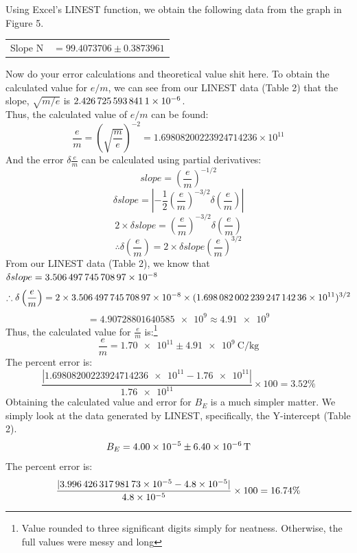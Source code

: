 \documentclass[letterpaper]{article}
\begin{document}
\newpage
\noindent Using Excel's LINEST function, we obtain the following data from the graph in Figure 5.
\begin{table}[H]
\centering
\begin{tabular}{cc}
  Slope N &  $ =99.4073706 \pm 0.3873961 $ \\
\end{tabular}
\end{table}

Now do your error calculations and theoretical value shit here.
\noindent To obtain the calculated value for $e/m$, we can see from our LINEST data (Table 2) that the slope, $\sqrt{m/e}$ is
$\num{2.4267255938411E-06}$.\\
Thus, the calculated value of $e/m$ can be found:
$$ \frac{e}{m} = \left(\sqrt{\frac{m}{e}}\right)^{-2} = 1.69808200223924714236 \times 10^{11} $$
And the error $\delta \frac{e}{m}$ can be calculated using partial derivatives:
$$slope= \left(\frac{e}{m}\right)^{-1/2}$$
$$\delta slope = \left| -\frac{1}{2} \left(\frac{e}{m}\right)^{-3/2} \delta \left(\frac{e}{m}\right)\right|$$
$$ 2 \times \delta slope = \left(\frac{e}{m}\right)^{-3/2} \delta \left(\frac{e}{m}\right) $$
$$ \therefore \delta \left(\frac{e}{m}\right) = 2 \times \delta slope \left(\frac{e}{m}\right)^{3/2}$$
From our LINEST data (Table 2), we know that $\delta slope = \num{3.50649774570897E-08} $
$$ \therefore \delta \left(\frac{e}{m}\right) = 2 \times \num{3.50649774570897E-08} \times (\num{1.69808200223924714236e11})^{3/2}$$
$$= \num{4.90728801640585e9} \approx \num{4.91e9}$$
Thus, the calculated value for $\frac{e}{m}$ is:\footnote{Value rounded to three significant digits simply for neatness. Otherwise, the full values were messy and long}
$$\frac{e}{m}=\num{1.70e11} \pm \SI{4.91e9}{\coulomb\per\kilogram}$$
The percent error is:
$$ \frac{|\num{1.69808200223924714236e11}-\num{1.76e11}|}{\num{1.76e11}}\times100 = 3.52\%$$
Obtaining the calculated value and error for $B_E$ is a much simpler matter. We simply
look at the data generated by LINEST, specifically, the Y-intercept (Table 2).
$$B_E = \num{4.00E-05}\pm \SI{6.40E-06}{\tesla}$$
The percent error is:
$$ \frac{|\num{3.99642631798173E-05}-\num{4.8e-5}|}{\num{4.8e-5}}\times100 = 16.74\%$$
\end{document}
